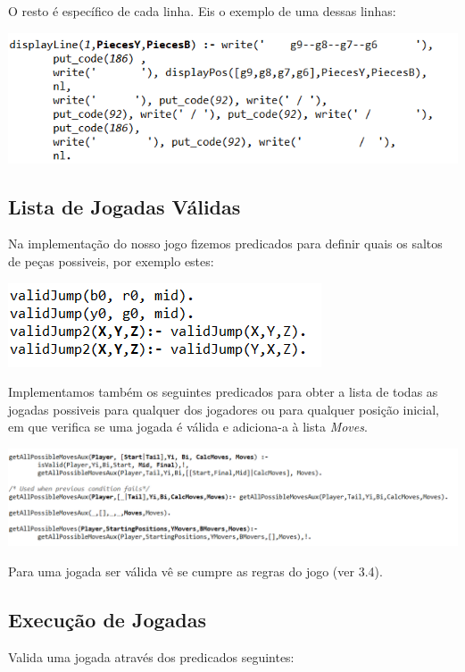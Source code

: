 \documentclass[a4paper]{article}
\begin{document}
O resto é específico de cada linha. Eis o exemplo de uma dessas linhas: 

\includegraphics[scale=0.8]{displayBoard2.png}\linebreak\linebreak

\subsection{Lista de Jogadas Válidas} Na implementação do nosso jogo fizemos predicados para definir quais os saltos de peças possiveis, por exemplo estes:

\includegraphics[scale=0.8]{predicados.png}\linebreak\linebreak

Implementamos também os seguintes predicados para obter a lista de todas as jogadas possiveis para qualquer dos jogadores ou para qualquer posição inicial, em que verifica se uma jogada é válida e adiciona-a à lista \textit{Moves}.
\begin{center}
\includegraphics[scale=0.7]{allpossiblemoves.png}\linebreak
\end{center} 
Para uma jogada ser válida vê se cumpre as regras do jogo (ver 3.4).

\subsection{Execução de Jogadas} Valida uma jogada através dos predicados seguintes: 
\end{document}
